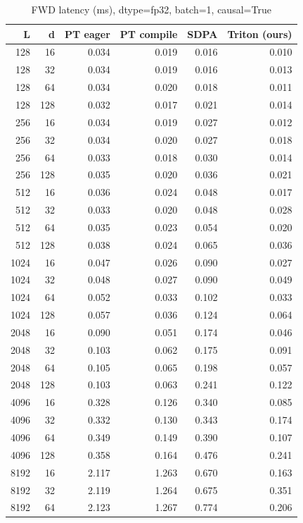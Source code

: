 \documentclass[11pt]{article}
\begin{document}
\begin{table}[H]\small\centering
\caption{FWD latency (ms), dtype=fp32, batch=1, causal=True}
\label{tab:fa2-fp32-fwd}
\begin{tabular}{rrrrrr}
\toprule
L & d & PT eager & PT compile & SDPA & Triton (ours) \\
\midrule
128 & 16 & 0.034 & 0.019 & 0.016 & 0.010 \\
128 & 32 & 0.034 & 0.019 & 0.016 & 0.013 \\
128 & 64 & 0.034 & 0.020 & 0.018 & 0.011 \\
128 & 128 & 0.032 & 0.017 & 0.021 & 0.014 \\
256 & 16 & 0.034 & 0.019 & 0.027 & 0.012 \\
256 & 32 & 0.034 & 0.020 & 0.027 & 0.018 \\
256 & 64 & 0.033 & 0.018 & 0.030 & 0.014 \\
256 & 128 & 0.035 & 0.020 & 0.036 & 0.021 \\
512 & 16 & 0.036 & 0.024 & 0.048 & 0.017 \\
512 & 32 & 0.033 & 0.020 & 0.048 & 0.028 \\
512 & 64 & 0.035 & 0.023 & 0.054 & 0.020 \\
512 & 128 & 0.038 & 0.024 & 0.065 & 0.036 \\
1024 & 16 & 0.047 & 0.026 & 0.090 & 0.027 \\
1024 & 32 & 0.048 & 0.027 & 0.090 & 0.049 \\
1024 & 64 & 0.052 & 0.033 & 0.102 & 0.033 \\
1024 & 128 & 0.057 & 0.036 & 0.124 & 0.064 \\
2048 & 16 & 0.090 & 0.051 & 0.174 & 0.046 \\
2048 & 32 & 0.103 & 0.062 & 0.175 & 0.091 \\
2048 & 64 & 0.105 & 0.065 & 0.198 & 0.057 \\
2048 & 128 & 0.103 & 0.063 & 0.241 & 0.122 \\
4096 & 16 & 0.328 & 0.126 & 0.340 & 0.085 \\
4096 & 32 & 0.332 & 0.130 & 0.343 & 0.174 \\
4096 & 64 & 0.349 & 0.149 & 0.390 & 0.107 \\
4096 & 128 & 0.358 & 0.164 & 0.476 & 0.241 \\
8192 & 16 & 2.117 & 1.263 & 0.670 & 0.163 \\
8192 & 32 & 2.119 & 1.264 & 0.675 & 0.351 \\
8192 & 64 & 2.123 & 1.267 & 0.774 & 0.206 \\

\end{tabular}
\end{table}
\end{document}
